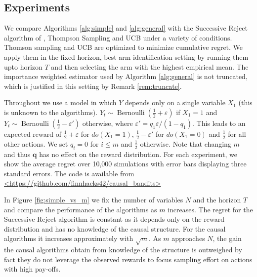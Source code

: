 \documentclass[11pt,a4paper,oneside]{book}
\newcommand{\bernoulli}{\operatorname{Bernoulli}}
\let\epsilon\varepsilon
\begin{document}
\subsection*{Experiments}
We compare Algorithms \ref{alg:simple} and \ref{alg:general} with the Successive Reject algorithm of \cite{audibert2010best}, Thompson Sampling and UCB under a variety of conditions. Thomson sampling and UCB are optimized to minimize cumulative regret. We apply them in the fixed horizon, best arm identification setting by running them upto horizon $T$ and then selecting the arm with the highest empirical mean. The importance weighted estimator used by Algorithm \ref{alg:general} is not truncated, which is justified in this setting by Remark \ref{rem:truncate}. 

Throughout we use a model in which $Y$ depends only on a single variable $X_1$ (this is unknown to the algorithms). $Y_t \sim \bernoulli(\frac{1}{2}+\epsilon)$ if $X_1=1$ and $Y_t \sim \bernoulli(\frac{1}{2}-\epsilon')$ otherwise, where $\epsilon' = q_1\epsilon/(1-q_1)$. This leads to an expected reward of $\frac{1}{2}+\epsilon$ for $do(X_1=1)$, $\frac{1}{2}-\epsilon'$ for $do(X_1=0)$ and $\frac{1}{2}$ for all other actions. We set $q_i = 0$ for $i \leq m$ and $\frac{1}{2}$ otherwise. Note that changing $m$ and thus $\boldsymbol{q}$ has no effect on the reward distribution. For each experiment, we show the average regret over 10,000 simulations with error bars displaying three standard errors. The code is available from \url{<https://github.com/finnhacks42/causal_bandits>} 

In Figure \ref{fig:simple_vs_m} we fix the number of variables $N$ and the horizon $T$ and compare the performance of the algorithms as $m$ increases. The regret for the Successive Reject algorithm is constant as it depends only on the reward distribution and has no knowledge of the causal structure. For the causal algorithms it increases approximately with $\sqrt{m}$. As $m$ approaches $N$, the gain the causal algorithms obtain from knowledge of the structure is outweighed by fact they do not leverage the observed rewards to focus sampling effort on actions with high pay-offs.
\end{document}
